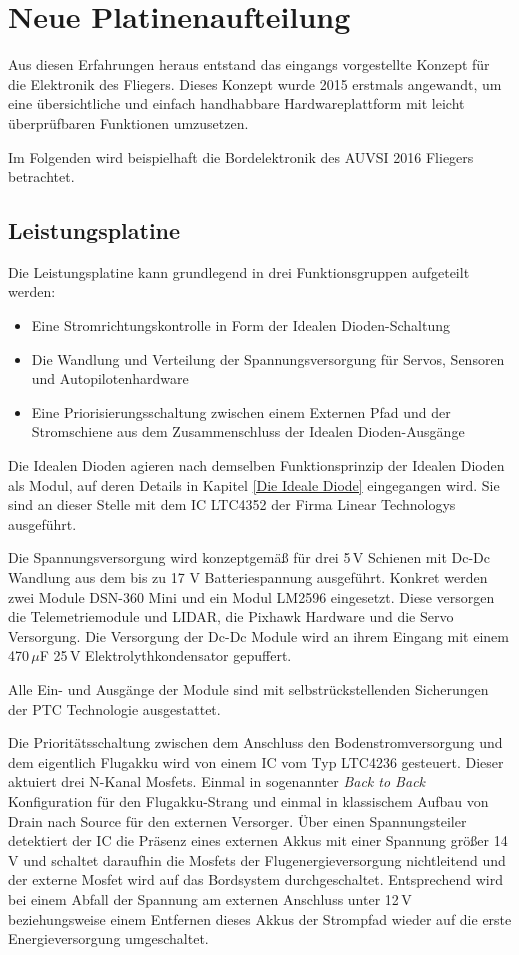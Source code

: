 \section{Neue Platinenaufteilung}

Aus diesen Erfahrungen heraus entstand das eingangs vorgestellte Konzept für die Elektronik des Fliegers.
Dieses Konzept wurde 2015 erstmals angewandt, um eine übersichtliche und einfach handhabbare Hardwareplattform mit leicht überprüfbaren Funktionen umzusetzen.

Im Folgenden wird beispielhaft die Bordelektronik des AUVSI 2016 Fliegers betrachtet.

\subsection{Leistungsplatine}

Die Leistungsplatine kann grundlegend in drei Funktionsgruppen aufgeteilt werden:

\begin{itemize}
    \item Eine Stromrichtungskontrolle in Form der Idealen Dioden-Schaltung
    \item Die Wandlung und Verteilung der Spannungsversorgung für Servos, Sensoren und Autopilotenhardware
    \item Eine Priorisierungsschaltung zwischen einem Externen Pfad und der Stromschiene aus dem Zusammenschluss der Idealen Dioden-Ausgänge
\end{itemize}


Die Idealen Dioden agieren nach demselben Funktionsprinzip der Idealen Dioden als Modul, auf deren Details in Kapitel \ref{Die Ideale Diode} eingegangen wird. Sie sind an dieser Stelle mit dem IC LTC4352 der Firma Linear Technologys ausgeführt.

Die Spannungsversorgung wird konzeptgemäß für drei 5\,V Schienen mit Dc-Dc Wandlung aus dem bis zu 17 V Batteriespannung ausgeführt. Konkret werden zwei Module DSN-360 Mini und ein Modul LM2596 eingesetzt. Diese versorgen die Telemetriemodule und LIDAR, die Pixhawk Hardware und die Servo Versorgung.
Die Versorgung der Dc-Dc Module wird an ihrem Eingang mit einem 470\,$\mu$F 25\,V  Elektrolythkondensator gepuffert.

Alle Ein- und Ausgänge der Module sind mit selbstrückstellenden Sicherungen der PTC Technologie ausgestattet.

Die Prioritätsschaltung zwischen dem Anschluss den Bodenstromversorgung und dem eigentlich Flugakku wird von einem IC vom Typ LTC4236 gesteuert. Dieser aktuiert drei N-Kanal Mosfets. Einmal in sogenannter \textit{Back to Back} Konfiguration für den Flugakku-Strang und einmal in klassischem Aufbau von Drain nach Source für den externen Versorger.
Über einen Spannungsteiler detektiert der IC die Präsenz eines externen Akkus mit einer Spannung größer 14\,V und schaltet daraufhin die Mosfets der Flugenergieversorgung nichtleitend und der externe Mosfet wird auf das Bordsystem durchgeschaltet. Entsprechend wird bei einem Abfall der Spannung am externen Anschluss unter 12\,V beziehungsweise einem Entfernen dieses Akkus der Strompfad wieder auf die erste Energieversorgung umgeschaltet.


